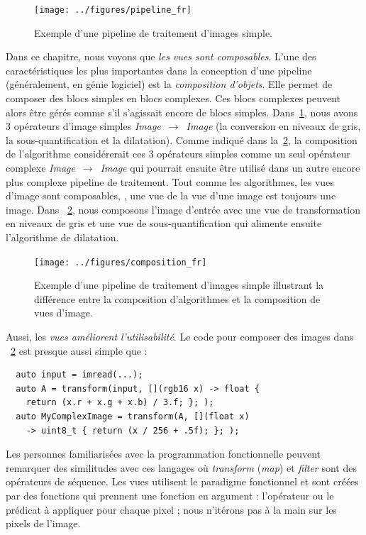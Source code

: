 \begin{figure}[htbp]
  \centering
  \texttt{[image: ../figures/pipeline\_fr]}
  \caption[]{Exemple d'une pipeline de traitement d'images simple.}
  \label{resume:fig:view.pipeline}
\end{figure}

Dans ce chapitre, nous voyons que \emph{les vues sont composables}. L'une des caractéristiques les plus importantes dans
la conception d'une pipeline (généralement, en génie logiciel) est la \emph{composition d'objets}. Elle permet de
composer des blocs simples en blocs complexes. Ces blocs complexes peuvent alors être gérés comme s'il s'agissait encore
de blocs simples. Dans~\cref{resume:fig:view.pipeline}, nous avons 3 opérateurs d'image simples
\emph{Image}~\(\rightarrow\)~\emph{Image} (la conversion en niveaux de gris, la sous-quantification et la dilatation).
Comme indiqué dans la~\cref{resume:fig:view.comp}, la composition de l'algorithme considérerait ces 3 opérateurs simples
comme un seul opérateur complexe \emph{Image}~\(\rightarrow\)~\emph{Image} qui pourrait ensuite être utilisé dans un
autre encore plus complexe pipeline de traitement. Tout comme les algorithmes, les vues d'image sont composables, \prex,
une vue de la vue d'une image est toujours une image. Dans ~\cref{resume:fig:view.comp}, nous composons l'image d'entrée
avec une vue de transformation en niveaux de gris et une vue de sous-quantification qui alimente ensuite l'algorithme de
dilatation.

\begin{figure}[htbp]
  \centering
  \texttt{[image: ../figures/composition\_fr]}
  \caption[]{Exemple d'une pipeline de traitement d'images simple illustrant la différence entre la composition
    d'algorithmes et la composition de vues d'image.}
  \label{resume:fig:view.comp}
\end{figure}

Aussi, les \emph{vues améliorent l'utilisabilité}. Le code pour composer des images dans ~\cref{resume:fig:view.comp}
est presque aussi simple que :

\begin{verbatim}
  auto input = imread(...);
  auto A = transform(input, [](rgb16 x) -> float {
    return (x.r + x.g + x.b) / 3.f; }; );
  auto MyComplexImage = transform(A, [](float x)
    -> uint8_t { return (x / 256 + .5f); }; );
\end{verbatim}

Les personnes familiarisées avec la programmation fonctionnelle peuvent remarquer des similitudes avec ces langages où
\emph{transform} (\emph{map}) et \emph{filter} sont des opérateurs de séquence. Les vues utilisent le paradigme
fonctionnel et sont créées par des fonctions qui prennent une fonction en argument : l'opérateur ou le prédicat à
appliquer pour chaque pixel ; nous n'itérons pas à la main sur les pixels de l'image.

